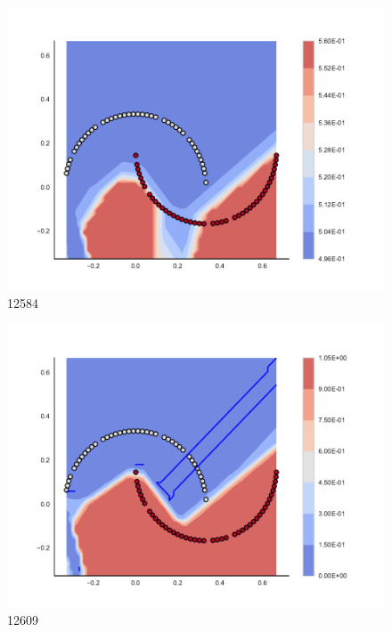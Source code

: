 \begin{subfigure}[b]{0.09\textwidth}
    \includegraphics[width=\textwidth]{img/convergence/12584.pdf}
    \caption{12584}
    \label{fig:convergence_12584}
\end{subfigure}
%
\begin{subfigure}[b]{0.09\textwidth}
    \includegraphics[width=\textwidth]{img/convergence/12609.pdf}
    \caption{12609}
    \label{fig:convergence_12609}
\end{subfigure}
%
